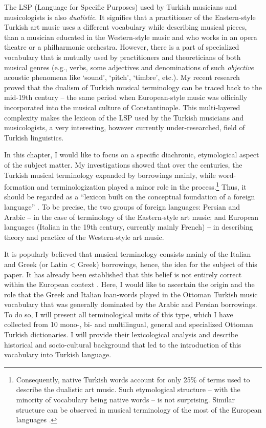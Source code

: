 \documentclass[output=paper,colorlinks,citecolor=brown,arabicfont,chinesefont]{langscibook}
\begin{document}
The LSP (Language for Specific Purposes) used by Turkish musicians and musicologists is also \emph{dualistic}. It signifies that a practitioner of the Eastern-style Turkish art music uses a different vocabulary while describing musical pieces, than a musician educated in the Western-style music and who works in an opera theatre or a philharmonic orchestra. However, there is a part of specialized vocabulary that is mutually used by practitioners and theoreticians of both musical genres (e.g., verbs, some adjectives and denominations of such \emph{objective} acoustic phenomena like ‘sound’, ‘pitch’, ‘timbre’, etc.). My recent research \citep{Pawlina2021} proved that the dualism of Turkish musical terminology can be traced back to the mid-19th century – the same period when European-style music was officially incorporated into the musical culture of Constantinople. This multi-layered complexity makes the lexicon of the LSP used by the Turkish musicians and musicologists, a very interesting, however currently under-researched, field of Turkish linguistics.

In this chapter, I would like to focus on a specific diachronic, etymological aspect of the subject matter. My investigations showed that over the centuries, the Turkish musical terminology expanded by borrowings mainly, while word-formation and terminologization played a minor role in the process.\footnote{Consequently, native Turkish words account for only 25\% of terms used to describe the dualistic art music. Such etymological structure – with the minority of vocabulary being native words – is not surprising. Similar structure can be observed in musical terminology of the most of the European languages \citep{Dabkowski1997}.} Thus, it should be regarded as a “lexicon built on the conceptual foundation of a foreign language” \citep[59]{LukszynZmarzer2006}. To be precise, the two groups of foreign languages: Persian and Arabic ‒ in the case of terminology of the Eastern-style art music; and European languages (Italian in the 19th century, currently mainly French) ‒ in describing theory and practice of the Western-style art music.

It is popularly believed that musical terminology consists mainly of the Italian and Greek (or Latin < Greek) borrowings, hence, the idea for the subject of this paper. It has already been established that this belief is not entirely correct within the European context \citep{Dabkowski1997}. Here, I would like to ascertain the origin and the role that the Greek and Italian loan-words played in the Ottoman Turkish music vocabulary that was generally dominated by the Arabic and Persian borrowings. To do so, I will present all terminological units of this type, which I have collected from 10 mono-, bi- and multilingual, general and specialized Ottoman Turkish dictionaries. I will provide their lexicological analysis and describe historical and socio-cultural background that led to the introduction of this vocabulary into Turkish language.
\end{document}
